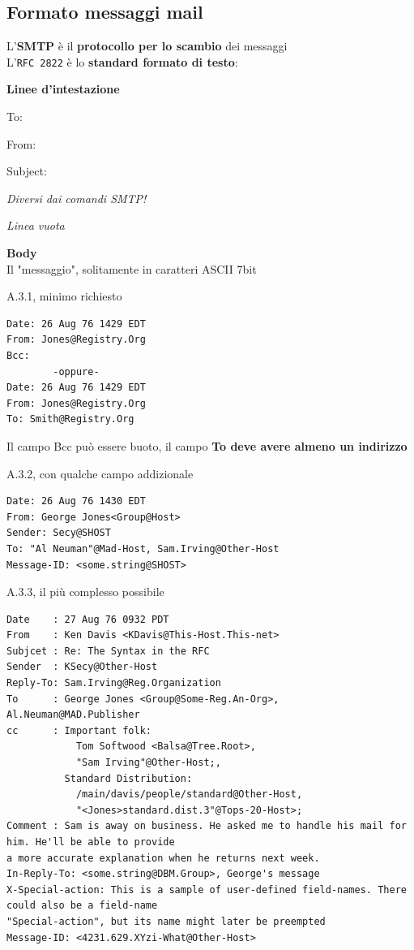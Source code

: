 \documentclass[10pt]{article}
\begin{document}
\subsection{Formato messaggi mail}
L'\textbf{SMTP} è il \textbf{protocollo per lo scambio} dei messaggi\\
L'\texttt{RFC 2822} è lo \textbf{standard formato di testo}:
\begin{list}{}{}
\item \textbf{Linee d'intestazione}
\begin{list}{}{ad esempio}
\item To:
\item From:
\item Subject:
\item \textit{Diversi dai comandi SMTP!}
\end{list}
\item \textit{Linea vuota}
\item \textbf{Body}\\Il "messaggio", solitamente in caratteri ASCII 7bit
\end{list}
\begin{list}{}{Esempi di header:}
\item A.3.1, minimo richiesto
\begin{verbatim}
Date: 26 Aug 76 1429 EDT
From: Jones@Registry.Org
Bcc: 
		-oppure-
Date: 26 Aug 76 1429 EDT
From: Jones@Registry.Org
To: Smith@Registry.Org
\end{verbatim}
Il campo Bcc può essere buoto, il campo \textbf{To deve avere almeno un indirizzo}
\item A.3.2, con qualche campo addizionale
\begin{verbatim}
Date: 26 Aug 76 1430 EDT
From: George Jones<Group@Host>
Sender: Secy@SHOST
To: "Al Neuman"@Mad-Host, Sam.Irving@Other-Host
Message-ID: <some.string@SHOST>
\end{verbatim}
\item A.3.3, il più complesso possibile
\begin{verbatim}
Date    : 27 Aug 76 0932 PDT
From    : Ken Davis <KDavis@This-Host.This-net>
Subjcet : Re: The Syntax in the RFC
Sender  : KSecy@Other-Host
Reply-To: Sam.Irving@Reg.Organization
To      : George Jones <Group@Some-Reg.An-Org>, Al.Neuman@MAD.Publisher
cc      : Important folk:
            Tom Softwood <Balsa@Tree.Root>,
            "Sam Irving"@Other-Host;,
          Standard Distribution:
            /main/davis/people/standard@Other-Host,
            "<Jones>standard.dist.3"@Tops-20-Host>;
Comment : Sam is away on business. He asked me to handle his mail for him. He'll be able to provide
a more accurate explanation when he returns next week.
In-Reply-To: <some.string@DBM.Group>, George's message
X-Special-action: This is a sample of user-defined field-names. There could also be a field-name
"Special-action", but its name might later be preempted
Message-ID: <4231.629.XYzi-What@Other-Host>
\end{verbatim}
\end{list}
\pagebreak
\end{document}
